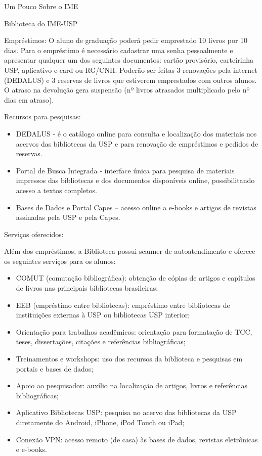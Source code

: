 \begin{secao}{Um Pouco Sobre o IME}
\begin{subsecao}{Biblioteca do IME-USP}
\begin{subsubsecao}{Empréstimos:}
O aluno de graduação poderá pedir emprestado 10 livros por 10 dias. Para o empréstimo é necessário cadastrar uma senha pessoalmente e apresentar qualquer um dos seguintes documentos: cartão provisório, carteirinha USP, aplicativo e-card ou RG/CNH. Poderão ser feitas 3 renovações pela internet (DEDALUS) e 3 reservas de livros que estiverem emprestados com outros alunos. O atraso na devolução gera suspensão (nº livros atrasados multiplicado pelo nº dias em atraso). 
\end{subsubsecao}

\pagebreak

\begin{subsubsecao}{Recursos para pesquisas:}
\vspace{-15pt}
\begin{itemize}
    \item DEDALUS - é o catálogo online para consulta e localização dos materiais nos acervos das bibliotecas da USP e para renovação de empréstimos e pedidos de reservas. 
    \item Portal de Busca Integrada - interface única para pesquisa de materiais impressos das bibliotecas e dos documentos disponíveis online, possibilitando acesso a textos completos. 
    \item Bases de Dados e Portal Capes – acesso online a e-books e artigos de revistas assinadas pela USP e pela Capes.
    \end{itemize}
\end{subsubsecao}

\begin{subsubsecao}{Serviços oferecidos:}

Além dos empréstimos, a Biblioteca possui scanner de autoatendimento e oferece os seguintes serviços para os alunos:
\vspace{-15pt}
\begin{itemize}
    \item COMUT (comutação bibliográfica): obtenção de cópias de artigos e capítulos de livros nas principais bibliotecas brasileiras; 
    \item EEB (empréstimo entre bibliotecas): empréstimo entre bibliotecas de instituições externas à USP ou bibliotecas USP interior;
    \item Orientação para trabalhos acadêmicos: orientação para formatação de TCC, teses, dissertações, citações e referências bibliográficas;
    \item Treinamentos e workshops: uso dos recursos da biblioteca e pesquisas em portais e bases de dados;
    \item Apoio ao pesquisador: auxílio na localização de artigos, livros e referências bibliográficas;
    \item Aplicativo Bibliotecas USP: pesquisa no acervo das bibliotecas da USP diretamente do Android, iPhone, iPod Touch ou iPad; 
    \item Conexão VPN: acesso remoto (de casa) às bases de dados, revistas eletrônicas e e-books. 
\end{itemize}
\end{subsubsecao}


\end{subsecao}
\end{secao}
